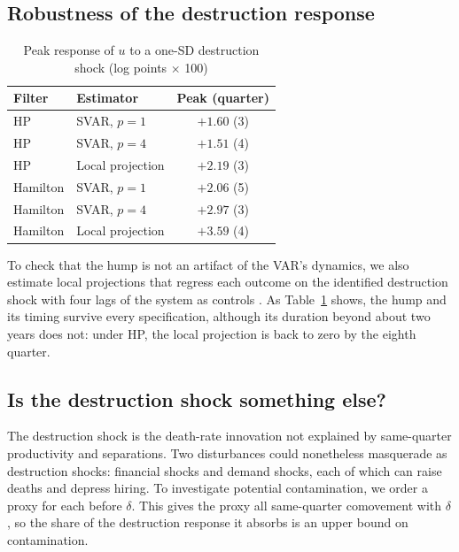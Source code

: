 \documentclass[authoryear, review, 12pt]{elsarticle}
\begin{document}
\subsection{Robustness of the destruction response}

\begin{table}[H]
\centering
\caption{Peak response of $u$ to a one-SD destruction shock (log points $\times$ 100)}\label{tab:robust}
\small
\begin{tabular}{llc}
\toprule
Filter & Estimator & Peak (quarter) \\
\midrule
HP & SVAR, $p=1$ & $+1.60$ (3) \\
HP & SVAR, $p=4$ & $+1.51$ (4) \\
HP & Local projection & $+2.19$ (3) \\
Hamilton & SVAR, $p=1$ & $+2.06$ (5) \\
Hamilton & SVAR, $p=4$ & $+2.97$ (3) \\
Hamilton & Local projection & $+3.59$ (4) \\
\bottomrule
\end{tabular}
\end{table}

To check that the hump is not an artifact of the VAR's dynamics, we also estimate local projections that regress each outcome on the identified destruction shock with four lags of the system as controls \citep{jorda_2005}. As Table~\ref{tab:robust} shows, the hump and its timing survive every specification, although its duration beyond about two years does not: under HP, the local projection is back to zero by the eighth quarter.

\subsection{Is the destruction shock something else?}\label{sec:checks}

The destruction shock is the death-rate innovation not explained by same-quarter productivity and separations. Two disturbances could nonetheless masquerade as destruction shocks: financial shocks and demand shocks, each of which can raise deaths and depress hiring. To investigate potential contamination, we order a proxy for each before $\delta$. This gives the proxy all same-quarter comovement with $\delta$, so the share of the destruction response it absorbs is an upper bound on contamination.
\end{document}
